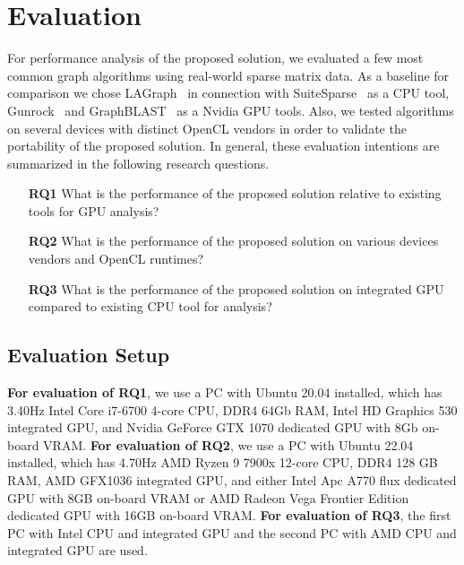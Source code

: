 \section{Evaluation}

For performance analysis of the proposed solution, we evaluated a few most common graph algorithms using real-world sparse matrix data. 
As a baseline for comparison we chose LAGraph~\cite{szarnyas2021lagraph} in connection with SuiteSparse~\cite{10.1145/3322125} as a CPU tool, Gunrock~\cite{7967137} and GraphBLAST~\cite{yang2019graphblast} as a Nvidia GPU tools. 
Also, we tested algorithms on several devices with distinct OpenCL vendors in order to validate the portability of the proposed solution. 
In general, these evaluation intentions are summarized in the following research questions. 

\vspace{0.2cm}
\begin{itemize}
    \item[\textbf{RQ1}] What is the performance of the proposed solution relative to existing tools for GPU analysis?
    
    \item[\textbf{RQ2}] What is the performance of the proposed solution on various devices vendors and OpenCL runtimes?

    \item[\textbf{RQ3}] What is the performance of the proposed solution on integrated GPU compared to existing CPU tool for analysis?
\end{itemize}

\subsection{Evaluation Setup}

\textbf{For evaluation of RQ1}, we use a PC with Ubuntu 20.04 installed, which has 3.40Hz Intel Core i7-6700 4-core CPU, DDR4 64Gb RAM, Intel HD Graphics 530 integrated GPU, and Nvidia GeForce GTX 1070 dedicated GPU with 8Gb on-board VRAM. 
\textbf{For evaluation of RQ2}, we use a PC with Ubuntu 22.04 installed, which has 4.70Hz AMD Ryzen 9 7900x 12-core CPU, DDR4 128 GB RAM, AMD GFX1036 integrated GPU, and either Intel Apc A770 flux dedicated GPU with 8GB on-board VRAM or AMD Radeon Vega Frontier Edition dedicated GPU with 16GB on-board VRAM.
\textbf{For evaluation of RQ3}, the first PC with Intel CPU and integrated GPU and the second PC with AMD CPU and integrated GPU are used.

